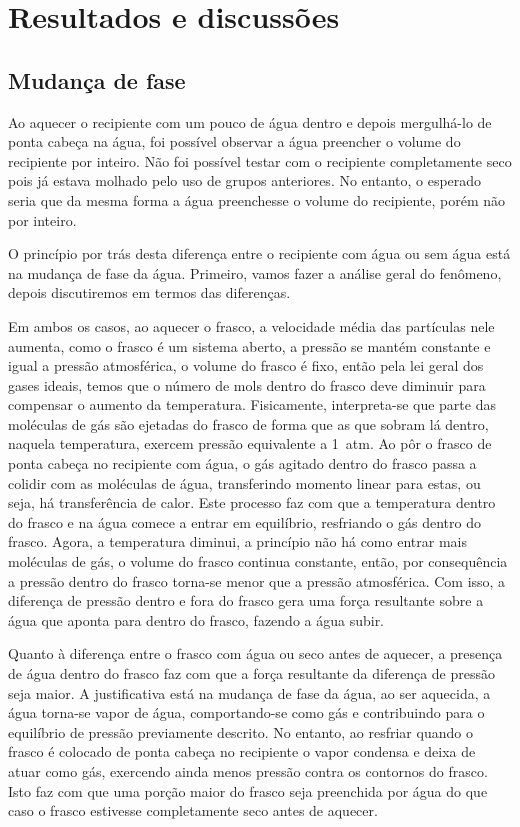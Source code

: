 \section{Resultados e discussões}

\subsection{Mudança de fase} %
Ao aquecer o recipiente com um pouco de água dentro e depois mergulhá-lo de ponta cabeça na água, foi possível observar a água preencher o volume do recipiente por inteiro. Não foi possível testar com o recipiente completamente seco pois já estava molhado pelo uso de grupos anteriores. No entanto, o esperado seria que da mesma forma a água preenchesse o volume do recipiente, porém não por inteiro. 

O princípio por trás desta diferença entre o recipiente com água ou sem água está na mudança de fase da água. Primeiro, vamos fazer a análise geral do fenômeno, depois discutiremos em termos das diferenças. 

Em ambos os casos, ao aquecer o frasco, a velocidade média das partículas nele aumenta, como o frasco é um sistema aberto, a pressão se mantém constante e igual a pressão atmosférica, o volume do frasco é fixo, então pela lei geral dos gases ideais, temos que o número de mols dentro do frasco deve diminuir para compensar o aumento da temperatura. Fisicamente, interpreta-se que parte das moléculas de gás são ejetadas do frasco de forma que as que sobram lá dentro, naquela temperatura, exercem pressão equivalente a \qty{1}{atm}. Ao pôr o frasco de ponta cabeça no recipiente com água, o gás agitado dentro do frasco passa a colidir com as moléculas de água, transferindo momento linear para estas, ou seja, há transferência de calor. Este processo faz com que a temperatura dentro do frasco e na água comece a entrar em equilíbrio, resfriando o gás dentro do frasco. Agora, a temperatura diminui, a princípio não há como entrar mais moléculas de gás, o volume do frasco continua constante, então, por consequência a pressão dentro do frasco torna-se menor que a pressão atmosférica. Com isso, a diferença de pressão dentro e fora do frasco gera uma força resultante sobre a água que aponta para dentro do frasco, fazendo a água subir.

Quanto à diferença entre o frasco com água ou seco antes de aquecer, a presença de água dentro do frasco faz com que a força resultante da diferença de pressão seja maior. A justificativa está na mudança de fase da água, ao ser aquecida, a água torna-se vapor de água, comportando-se como gás e contribuindo para o equilíbrio de pressão previamente descrito. No entanto, ao resfriar quando o frasco é colocado de ponta cabeça no recipiente o vapor condensa e deixa de atuar como gás, exercendo ainda menos pressão contra os contornos do frasco. Isto faz com que uma porção maior do frasco seja preenchida por água do que caso o frasco estivesse completamente seco antes de aquecer.

